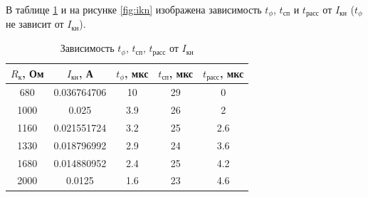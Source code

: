 В таблице \ref{tab:ikn} и на рисунке \ref{fig:ikn} изображена зависимость $t_\phi$, $t_\text{сп}$ и $t_\text{расс}$ от $I_{\text{кн}}$ ($t_\phi$ не зависит от $I_{\text{кн}}$).

\begin{table}[H]
	\begin{center}
	\caption{Зависимость $t_\phi$, $t_\text{сп}$, $t_\text{расс}$ от $I_{\text{кн}}$}
		\begin{tabular}{|c|c|c|c|c|}
		\hline 
		$R_\text{к}$, Ом & $I_{\text{кн}}$, А & $t_\phi$, мкс & $t_\text{сп}$, мкс & $t_\text{расс}$, мкс \\ 
		\hline 
		680 & 0.036764706 & 10 & 29 & 0 \\
		\hline
		1000 & 0.025 & 3.9 & 26 & 2 \\
		\hline
		1160 & 0.021551724 & 3.2 & 25 & 2.6 \\
		\hline
		1330 & 0.018796992 & 2.9 & 24 & 3.6 \\
		\hline
		1680 & 0.014880952 & 2.4 & 25 & 4.2 \\
		\hline
		2000 & 0.0125 & 1.6 & 23 & 4.6 \\
		\hline
		\end{tabular} 
		\label{tab:ikn}
	\end{center}
\end{table}
\vspace{-1.5cm}
